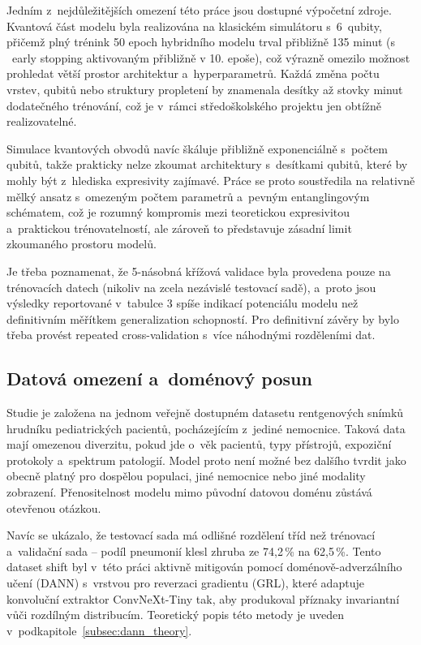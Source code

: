 \documentclass[12pt, a4paper]{report}
\begin{document}
Jedním z~nejdůležitějších omezení této práce jsou dostupné výpočetní zdroje. Kvantová část modelu byla realizována na klasickém simulátoru s~6~qubity, přičemž plný trénink 50 epoch hybridního modelu trval přibližně 135 minut (s ~early stopping aktivovaným přibližně v 10. epoše), což výrazně omezilo možnost prohledat větší prostor architektur a~hyperparametrů. Každá změna počtu vrstev, qubitů nebo struktury propletení by znamenala desítky až stovky minut dodatečného trénování, což je v~rámci středoškolského projektu jen obtížně realizovatelné.

Simulace kvantových obvodů navíc škáluje přibližně exponenciálně s~počtem qubitů, takže prakticky nelze zkoumat architektury s~desítkami qubitů, které by mohly být z~hlediska expresivity zajímavé. Práce se proto soustředila na relativně mělký ansatz s~omezeným počtem parametrů a~pevným entanglingovým schématem, což je rozumný kompromis mezi teoretickou expresivitou a~praktickou trénovatelností, ale zároveň to představuje zásadní limit zkoumaného prostoru modelů.

Je třeba poznamenat, že 5-násobná křížová validace byla provedena pouze na trénovacích datech (nikoliv na zcela nezávislé testovací sadě), a~proto jsou výsledky reportované v~tabulce 3 spíše indikací potenciálu modelu než definitivním měřítkem generalization schopností. Pro definitivní závěry by bylo třeba provést repeated cross-validation s~více náhodnými rozděleními dat.

\subsection{Datová omezení a~doménový posun}

Studie je založena na jednom veřejně dostupném datasetu rentgenových snímků hrudníku pediatrických pacientů, pocházejícím z~jediné nemocnice. Taková data mají omezenou diverzitu, pokud jde o~věk pacientů, typy přístrojů, expoziční protokoly a~spektrum patologií. Model proto není možné bez dalšího tvrdit jako obecně platný pro dospělou populaci, jiné nemocnice nebo jiné modality zobrazení. Přenositelnost modelu mimo původní datovou doménu zůstává otevřenou otázkou.

Navíc se ukázalo, že testovací sada má odlišné rozdělení tříd než trénovací a~validační sada – podíl pneumonií klesl zhruba ze 74{,}2\,\% na 62{,}5\,\%. Tento dataset shift byl v~této práci aktivně mitigován pomocí doménově-adverzálního učení (DANN) s~vrstvou pro reverzaci gradientu (GRL), které adaptuje konvoluční extraktor ConvNeXt-Tiny tak, aby produkoval příznaky invariantní vůči rozdílným distribucím. Teoretický popis této metody je uveden v~podkapitole~\ref{subsec:dann_theory}.
\end{document}
